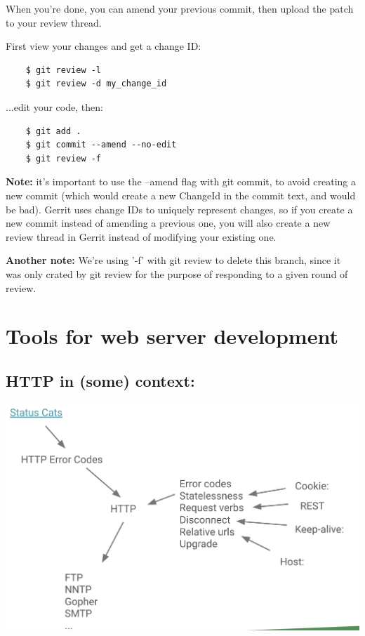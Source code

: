 \documentclass{article}
\begin{document}
When you're done, you can amend your previous commit, then upload the patch to your review thread. 

\vspace*{1em}

First view your changes and get a change ID:

\begin{verbatim}
    $ git review -l
    $ git review -d my_change_id
\end{verbatim}

...edit your code, then:

\begin{verbatim}
    $ git add .
    $ git commit --amend --no-edit
    $ git review -f 
\end{verbatim}

\textbf{Note: } it's important to use the --amend flag with git commit, to avoid creating a new commit (which would create a new ChangeId in the commit text, and would be bad). Gerrit uses change IDs to uniquely represent changes, so if you create a new commit instead of amending a previous one, you will also create a new review thread in Gerrit instead of modifying your existing one.

\textbf{Another note:} We're using '-f' with git review to delete this branch, since it was only crated by git review for the purpose of responding to a given round of review.

\pagebreak

\section{Tools for web server development}

\subsection*{HTTP in (some) context:}
\includegraphics*[width=\linewidth]{HTTPinContext.png}
\end{document}
